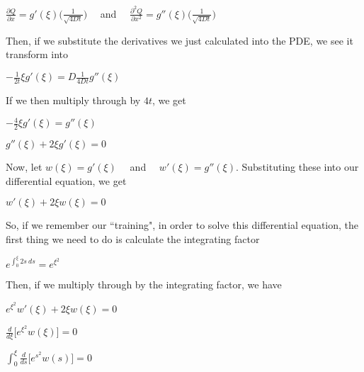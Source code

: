 \documentclass[executivepaper]{article}
\begin{document}
\begin{flushleft}
\begin{center}
$\frac{\partial Q}{\partial x}=g'(\xi)\bigg(\frac{1}{\sqrt{4Dt}}\bigg) \quad$ and $\quad \frac{\partial^2 Q}{\partial x^2}=g''(\xi)\bigg(\frac{1}{\sqrt{4Dt}}\bigg)$

\vspace{3mm}

Then, if we substitute the derivatives we just calculated into the PDE, we see it transform into

\vspace{2mm}

$-\frac{1}{2t} \xi g'(\xi)=D \frac{1}{4Dt} g''(\xi)$

\vspace{1mm}

If we then multiply through by $4t$, we get

\vspace{1mm}

$-\frac{4}{2} \xi g'(\xi)=g''(\xi)$

\vspace{1mm}

$g''(\xi)+2\xi g'(\xi)=0$

\vspace{3mm}

Now, let $w(\xi)=g'(\xi) \quad$ and $\quad w'(\xi)=g''(\xi)$. Substituting these into our differential equation, we get

\vspace{2mm}

$w'(\xi)+2\xi w(\xi)=0$

So, if we remember our ``training", in order to solve this differential equation, the first thing we need to do is calculate the integrating factor

\vspace{2mm}

$e^{\int_{0}^{\xi} 2s \ ds}=e^{\xi^{2}}$

\vspace{2mm}

Then, if we multiply through by the integrating factor, we have

\vspace{2mm}

$e^{\xi^{2}} w'(\xi)+2\xi w(\xi)=0$

\vspace{2mm}

$\frac{d}{d\xi} \bigg[e^{\xi^{2}} w(\xi)\bigg]=0$

\vspace{2mm}

$\int_{0}^{\xi} \frac{d}{ds} \bigg[e^{s^{2}} w(s)\bigg]=0$


\end{center}
\end{flushleft}
\end{document}
